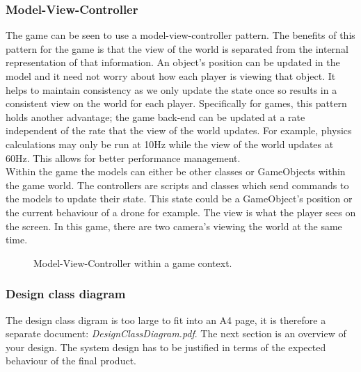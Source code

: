 \documentclass[11pt,a4paper]{article}
\begin{document}
\subsubsection{Model-View-Controller}
The game can be seen to use a model-view-controller pattern. The benefits of this pattern for the game is that the view of the world is separated from the internal representation of that information. An object's position can be updated in the model and it need not worry about how each player is viewing that object. It helps to maintain consistency as we only update the state once so results in a consistent view on the world for each player. Specifically for games, this pattern holds another advantage; the game back-end can be updated at a rate independent of the rate that the view of the world updates. For example, physics calculations may only be run at 10Hz while the view of the world updates at 60Hz. This allows for better performance management.\smallskip\\
Within the game the models can either be other classes or GameObjects within the game world. The controllers are scripts and classes which send commands to the models to update their state. This state could be a GameObject's position or the current behaviour of a drone for example. The view is what the player sees on the screen. In this game, there are two camera's viewing the world at the same time.
\begin{figure}[H]
    \caption{Model-View-Controller within a game context.}
    \label{fig:mvc}
\end{figure}
\subsubsection{Design class diagram}
The design class digram is too large to fit into an A4 page, it is therefore a separate document: \textit{DesignClassDiagram.pdf}.
\newline
\newline
\newline
The next section is an overview of your design. The system design has
to be justified in terms of the expected behaviour of the final
product. 
\end{document}
